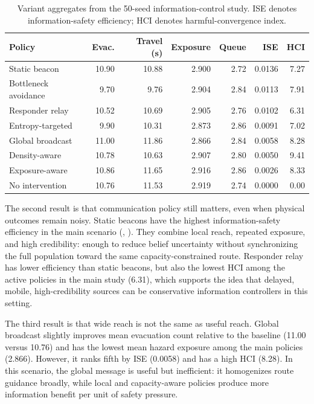 \begin{table}[!t]
\centering
\caption{Variant aggregates from the 50-seed information-control study. ISE
denotes information-safety efficiency; HCI denotes harmful-convergence index.}
\label{tab:aggregate}
\begin{tabular}{lrrrrrr}
\toprule
Policy & Evac. & Travel (s) & Exposure & Queue & ISE & HCI \\
\midrule
Static beacon & 10.90 & 10.88 & 2.900 & 2.72 & 0.0136 & 7.27 \\
Bottleneck avoidance & 9.70 & 9.76 & 2.904 & 2.84 & 0.0113 & 7.91 \\
Responder relay & 10.52 & 10.69 & 2.905 & 2.76 & 0.0102 & 6.31 \\
Entropy-targeted & 9.90 & 10.31 & 2.873 & 2.86 & 0.0091 & 7.02 \\
Global broadcast & 11.00 & 11.86 & 2.866 & 2.84 & 0.0058 & 8.28 \\
Density-aware & 10.78 & 10.63 & 2.907 & 2.80 & 0.0050 & 9.41 \\
Exposure-aware & 10.86 & 11.65 & 2.916 & 2.86 & 0.0026 & 8.33 \\
No intervention & 10.76 & 11.53 & 2.919 & 2.74 & 0.0000 & 0.00 \\
\bottomrule
\end{tabular}
\end{table}

The second result is that communication policy still matters, even when
physical outcomes remain noisy. Static beacons have the highest
information-safety efficiency in the main scenario
(\statBestPolicy{}, \statBestEfficiency{}). They combine local reach, repeated
exposure, and high credibility: enough to reduce belief uncertainty without
synchronizing the full population toward the same capacity-constrained route.
Responder relay has lower efficiency than static beacons, but also the lowest
HCI among the active policies in the main study (6.31), which supports the
idea that delayed, mobile, high-credibility sources can be conservative
information controllers in this setting.

The third result is that wide reach is not the same as useful reach. Global
broadcast slightly improves mean evacuation count relative to the baseline
(11.00 versus 10.76) and has the lowest mean hazard exposure among the main
policies (2.866). However, it ranks fifth by ISE (0.0058) and has a high HCI
(8.28). In this scenario, the global message is useful but inefficient: it
homogenizes route guidance broadly, while local and capacity-aware policies
produce more information benefit per unit of safety pressure.

